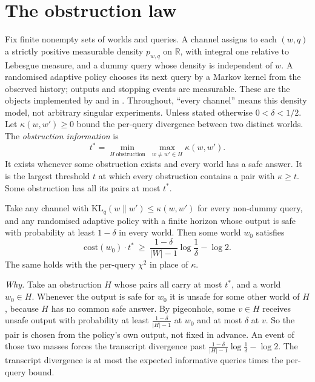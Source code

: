 
\section{The obstruction law}
\label{sec:law}

Fix finite nonempty sets of worlds and queries. A channel assigns to each $(w,q)$ a
strictly positive measurable density $p_{w,q}$ on $\mathbb R$, with integral one relative
to Lebesgue measure, and a dummy query whose density is independent of $w$.
A randomised adaptive policy chooses its next query by a Markov kernel from the observed
history; outputs and stopping events are measurable. These are the objects implemented by
 and  in .
Throughout, ``every channel'' means this density model, not arbitrary singular experiments.
Unless stated otherwise $0<\delta<1/2$. Let $\kappa(w,w')\ge0$ bound the per-query divergence
between two distinct worlds. The
\emph{obstruction information} is
\[
t^{*}=\min_{H\ \text{obstruction}}\ \max_{w\ne w'\in H}\kappa(w,w').
\]
It exists whenever some obstruction exists and every world has a safe answer. It is the largest
threshold $t$ at which every obstruction contains a pair with $\kappa\ge t$. Some obstruction
has all its pairs at most $t^{*}$.


\begin{theorem}
\label{thm:lower}
Take any channel with $\mathrm{KL}_{q}(w\|w')\le\kappa(w,w')$ for every non-dummy query, and
any randomised adaptive policy with a finite horizon whose output is safe with probability at
least $1-\delta$ in every world. Then some world $w_{0}$ satisfies
\[
\mathrm{cost}(w_{0})\cdot t^{*}\ \ge\ \frac{1-\delta}{|W|-1}\log\frac1\delta-\log2 .
\]
The same holds with the per-query $\chi^{2}$ in place of $\kappa$.
\end{theorem}


\emph{Why.} Take an obstruction $H$ whose pairs all carry at most $t^{*}$, and a world
$w_{0}\in H$. Whenever the output is safe for $w_{0}$ it is unsafe for some other world of $H$,
because $H$ has no common safe answer. By pigeonhole, some $v\in H$ receives unsafe output with
probability at least $\frac{1-\delta}{|H|-1}$ at $w_{0}$ and at most $\delta$ at $v$. So the pair
is chosen from the policy's own output, not fixed in advance. An event of those two masses
forces the transcript divergence past $\frac{1-\delta}{|H|-1}\log\frac1\delta-\log2$. The
transcript divergence is at most the expected informative queries times the per-query bound.

